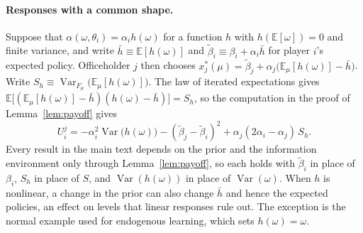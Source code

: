 \documentclass[12pt,letterpaper]{article}
\begin{document}
\paragraph{Responses with a common shape.}
Suppose that $\alpha(\omega,\theta_i)=\alpha_ih(\omega)$ for a function $h$ with $h(\mathbb{E}[\omega])=0$ and finite variance, and write $\bar h\equiv\mathbb{E}[h(\omega)]$ and $\tilde\beta_i\equiv\beta_i+\alpha_i\bar h$ for player $i$'s expected policy. Officeholder $j$ then chooses $x^*_j(\mu)=\tilde\beta_j+\alpha_j\big(\mathbb{E}_\mu[h(\omega)]-\bar h\big)$. Write $S_h\equiv\operatorname{Var}_{F_\mu}\big(\mathbb{E}_\mu[h(\omega)]\big)$. The law of iterated expectations gives $\mathbb{E}\big[(\mathbb{E}_\mu[h(\omega)]-\bar h)(h(\omega)-\bar h)\big]=S_h$, so the computation in the proof of Lemma~\ref{lem:payoff} gives
\[
U_i^j=-\alpha_i^2\operatorname{Var}\big(h(\omega)\big)-(\tilde\beta_j-\tilde\beta_i)^2+\alpha_j(2\alpha_i-\alpha_j)\,S_h .
\]
Every result in the main text depends on the prior and the information environment only through Lemma~\ref{lem:payoff}, so each holds with $\tilde\beta_i$ in place of $\beta_i$, $S_h$ in place of $S$, and $\operatorname{Var}(h(\omega))$ in place of $\operatorname{Var}(\omega)$. When $h$ is nonlinear, a change in the prior can also change $\bar h$ and hence the expected policies, an effect on levels that linear responses rule out. The exception is the normal example used for endogenous learning, which sets $h(\omega)=\omega$.
\end{document}
